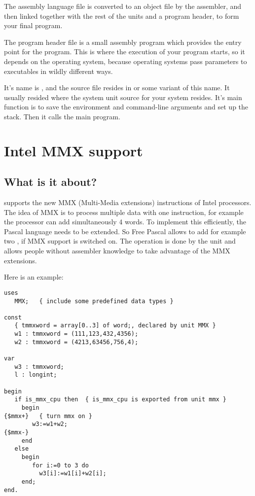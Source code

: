The assembly language file is converted to an object file by the assembler,
and then linked together with the rest of the units and a program header, to
form your final program.

The program header file is a small assembly program which provides the entry
point for the program. This is where the execution of your program starts,
so it depends on the operating system, because operating systems pass
parameters to executables in wildly different ways.

It's name is , and the
source file resides in  or some variant of this name. It
usually resided where the system unit source for your system resides.
It's main function is to save the environment and command-line arguments and
set up the stack. Then it calls the main program.

\chapter{Intel MMX support}
\label{ch:MMXSupport}

\section{What is it about?}
\label{se:WhatisMMXabout}
\fpc supports the new MMX (Multi-Media extensions)
instructions of Intel processors. The idea of MMX is to
process multiple data with one instruction, for example the processor
can add simultaneously 4 words. To implement this efficiently, the
Pascal language needs to be extended. So Free Pascal allows
to add for example two ,
if MMX support is switched on. The operation is done
by the  unit and allows people without assembler knowledge to take
advantage of the MMX extensions.

Here is an example:
\begin{verbatim}
uses
   MMX;   { include some predefined data types }

const
   { tmmxword = array[0..3] of word;, declared by unit MMX }
   w1 : tmmxword = (111,123,432,4356);
   w2 : tmmxword = (4213,63456,756,4);

var
   w3 : tmmxword;
   l : longint;

begin
   if is_mmx_cpu then  { is_mmx_cpu is exported from unit mmx }
     begin
{$mmx+}   { turn mmx on }
        w3:=w1+w2;
{$mmx-}
     end
   else
     begin
        for i:=0 to 3 do
          w3[i]:=w1[i]+w2[i];
     end;
end.
\end{verbatim}

